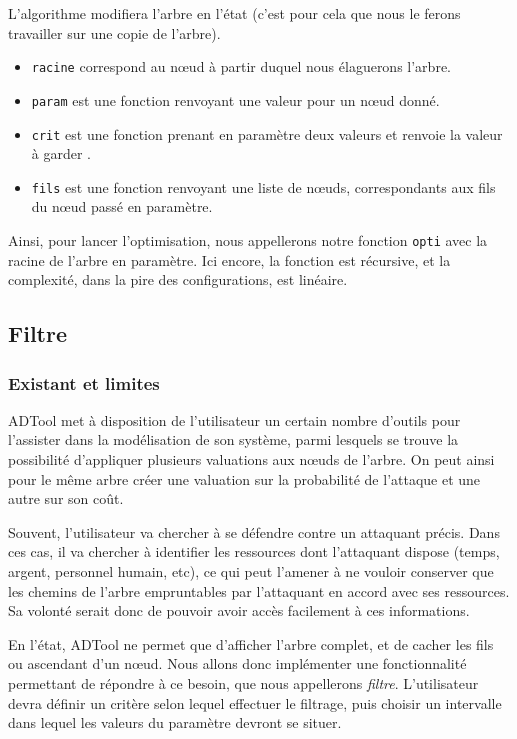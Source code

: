 		L'algorithme modifiera l'arbre en l'état (c'est pour cela que nous le ferons travailler sur une copie de l'arbre).
		\begin{itemize}
			\item \verb|racine| correspond au nœud à partir duquel nous élaguerons l'arbre.
			\item \verb|param| est une fonction renvoyant une valeur pour un nœud donné.
			\item \verb|crit| est une fonction prenant en paramètre deux valeurs et renvoie la valeur à \og garder \fg.
			\item \verb|fils| est une fonction renvoyant une liste de nœuds, correspondants aux fils du nœud passé en paramètre.
		\end{itemize}

		Ainsi, pour lancer l'optimisation, nous appellerons notre fonction \verb|opti| avec la racine de l'arbre en paramètre.
		Ici encore, la fonction est récursive, et la complexité, dans la pire des configurations, est linéaire.

	\subsection{Filtre}
	\label{subsection:filtre} 
			\subsubsection{Existant et limites}
		ADTool met à disposition de l'utilisateur un certain nombre d'outils pour l'assister dans la modélisation de son système, parmi lesquels se trouve la possibilité d'appliquer plusieurs valuations aux nœuds de l'arbre. On peut ainsi pour le même arbre créer une valuation sur la probabilité de l'attaque et une autre sur son coût.

		Souvent, l'utilisateur va chercher à se défendre contre un attaquant précis. Dans ces cas, il va chercher à identifier les ressources dont l'attaquant dispose (temps, argent, personnel humain, etc), ce qui peut l'amener à ne vouloir conserver que les chemins de l'arbre empruntables par l'attaquant en accord avec ses ressources. Sa volonté serait donc de pouvoir avoir accès facilement à ces informations.

		En l'état, ADTool ne permet que d'afficher l'arbre complet, et de cacher les fils ou ascendant d'un nœud. Nous allons donc implémenter une fonctionnalité permettant de répondre à ce besoin, que nous appellerons \textit{filtre}. L’utilisateur devra définir un critère selon lequel effectuer le filtrage, puis choisir un intervalle dans lequel les valeurs du paramètre devront se situer.
			
